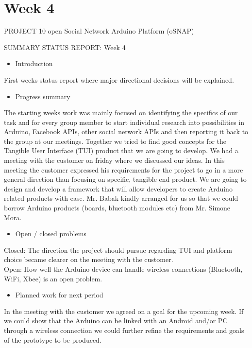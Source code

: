 \section{Week 4}

PROJECT 10 open Social Network Arduino Platform (oSNAP)

SUMMARY STATUS REPORT: Week 4

\begin{itemize}
\item Introduction
\end{itemize}
First weeks status report where major directional decisions will be explained.

\begin{itemize}
\item Progress summary
\end{itemize}
The starting weeks work was mainly focused on identifying the specifics of our task and for
every group member to start individual research into possibilities in Arduino, Facebook APIs,
other social network APIs and then reporting it back to the group at our meetings. Together we
tried to find good concepts for the Tangible User Interface (TUI) product that we are going to
develop. We had a meeting with the customer on friday where we discussed our ideas. In
this meeting the customer expressed his requirements for the project to go in a more
general direction than focusing on specific, tangible end product.
We are going to design and develop a framework that will allow developers to create
Arduino related products with ease. Mr. Babak kindly arranged for us so that we could
borrow Arduino products (boards, bluetooth modules etc) from Mr. Simone Mora.

\begin{itemize}
\item Open / closed problems
\end{itemize}
Closed: The direction the project should pursue regarding TUI and platform choice became clearer
on the meeting with the customer.
\\
Open: How well the Arduino device can handle wireless connections
(Bluetooth, WiFi, Xbee) is an open problem.

\newpage
\begin{itemize}
\item Planned work for next period
\end{itemize}
In the meeting with the customer we agreed on a goal for the upcoming week.
If we could show that the Arduino can be linked with an Android and/or PC
through a wireless connection we could further refine the requirements
and goals of the prototype to be produced.

